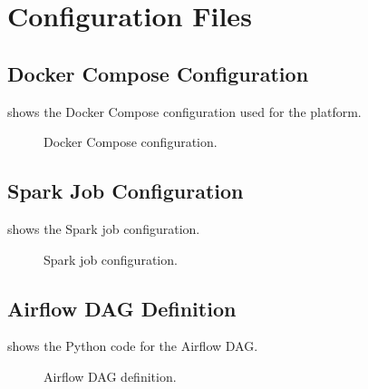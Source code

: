 
\chapter{Configuration Files}
\label{app:config}


\section{Docker Compose Configuration}
\label{app:docker_compose}

 shows the Docker Compose configuration used for the platform.

\begin{figure}[tbp]
\centering
{}
\caption{Docker Compose configuration.}
\label{fig:docker_compose}
\end{figure}

\section{Spark Job Configuration}
\label{app:spark_config}

 shows the Spark job configuration.

\begin{figure}[tbp]
\centering
{}
\caption{Spark job configuration.}
\label{fig:spark_config}
\end{figure}

\section{Airflow DAG Definition}
\label{app:airflow_dag}

 shows the Python code for the Airflow DAG.

\begin{figure}[tbp]
\centering
{}
\caption{Airflow DAG definition.}
\label{fig:airflow_dag_code}
\end{figure}
